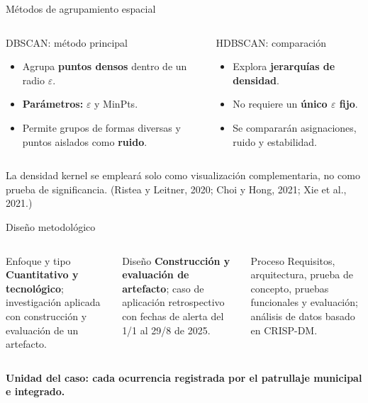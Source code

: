 \documentclass[aspectratio=169,10pt]{beamer}
\begin{document}
\begin{frame}{Métodos de agrupamiento espacial}
  \begin{columns}[T,onlytextwidth]
      \begin{block}{DBSCAN: método principal}
        \begin{itemize}
          \item Agrupa \textbf{puntos densos} dentro de un radio $\varepsilon$.
          \item \textbf{Parámetros:} $\varepsilon$ y MinPts.
          \item Permite grupos de formas diversas y puntos aislados como \textbf{ruido}.
        \end{itemize}
      \end{block}
      \begin{block}{HDBSCAN: comparación}
        \begin{itemize}
          \item Explora \textbf{jerarquías de densidad}.
          \item No requiere un \textbf{único $\varepsilon$ fijo}.
          \item Se compararán asignaciones, ruido y estabilidad.
        \end{itemize}
      \end{block}
  \end{columns}
  \vspace{.2cm}
  \footnotesize La densidad kernel se empleará solo como visualización complementaria, no como prueba de significancia. (Ristea y Leitner, 2020; Choi y Hong, 2021; Xie et al., 2021.)
\end{frame}

\begin{frame}{Diseño metodológico}
  \begin{columns}[T,onlytextwidth]
      \begin{block}{Enfoque y tipo}
        \textbf{Cuantitativo y tecnológico}; investigación aplicada con construcción y evaluación de un artefacto.
      \end{block}
      \begin{block}{Diseño}
        \textbf{Construcción y evaluación de artefacto}; caso de aplicación retrospectivo con fechas de alerta del 1/1 al 29/8 de 2025.
      \end{block}
      \begin{block}{Proceso}
        Requisitos, arquitectura, prueba de concepto, pruebas funcionales y evaluación; análisis de datos basado en CRISP-DM.
      \end{block}
  \end{columns}
  \vspace{.45cm}
  \centering\large\color{TesisVerde}\textbf{Unidad del caso: cada ocurrencia registrada por el patrullaje municipal e integrado.}
\end{frame}
\end{document}
